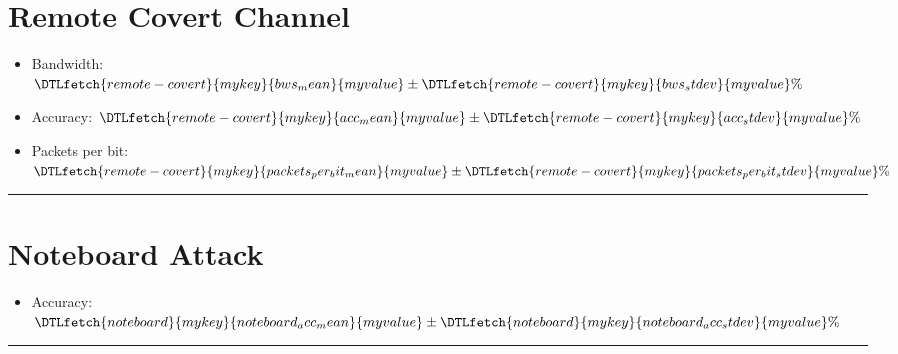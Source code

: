 \documentclass[letterpaper,twocolumn,10pt]{article}
\newcommand{\accessdatfile}[2]{\DTLfetch{#1}{mykey}{#2}{myvalue}}
\begin{document}
\begin{minipage}{\linewidth}
\section*{Remote Covert Channel}
\newcommand{\remotecovertdata}[1]{\accessdatfile{remote-covert}{#1}}
\begin{itemize}
    \item Bandwidth: $\remotecovertdata{bws_mean} \pm \remotecovertdata{bws_stdev} \% $
    \item Accuracy: $\remotecovertdata{acc_mean} \pm \remotecovertdata{acc_stdev} \% $
    \item Packets per bit: $\remotecovertdata{packets_per_bit_mean} \pm \remotecovertdata{packets_per_bit_stdev} \% $
\end{itemize}
\hrule
\end{minipage}


\begin{minipage}{\linewidth}
\section*{Noteboard Attack}
\newcommand{\noteboarddata}[1]{\accessdatfile{noteboard}{#1}}
\begin{itemize}
    \item Accuracy: $\noteboarddata{noteboard_acc_mean} \pm \noteboarddata{noteboard_acc_stdev} \% $
\end{itemize}
\hrule
\end{minipage}
\end{document}
